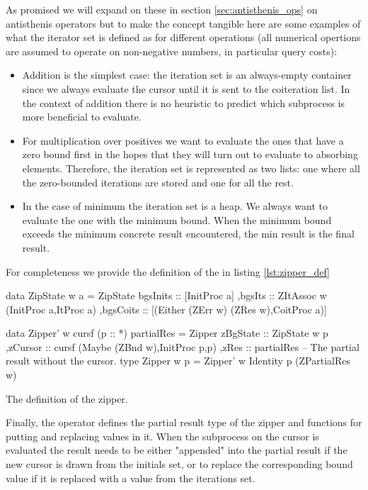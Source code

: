 As promised we will expand on these in section
\ref{sec:antisthenis_ops} on antisthenis operators but to make the
concept tangible here are some examples of what the iterator set is
defined as for different operations (all numerical opertions are
assumed to operate on non-negative numbers, in particular query
costs):

\begin{itemize}
\item Addition is the simplest case: the iteration set is an
  always-empty container since we always evaluate the cursor until it
  is sent to the coiteration list. In the context of addition there is
  no heuristic to predict which subprocess is more beneficial to
  evaluate.
\item For multiplication over positives we want to evaluate the ones
  that have a zero bound first in the hopes that they will turn out to
  evaluate to absorbing elements. Therefore, the iteration set is
  represented as two lists: one where all the zero-bounded iterations
  are stored and one for all the rest.
\item In the case of minimum the iteration set is a heap. We always
  want to evaluate the one with the minimum bound. When the minimum
  bound exceeds the minimum concrete result encountered, the min
  result is the final result.
\end{itemize}

For completeness we provide the definition of the  in
listing \ref{lst:zipper_def}

\begin{code}
\begin{haskellcode}
 data ZipState w a =
  ZipState
  { bgsInits :: [InitProc a]
   ,bgsIts :: ZItAssoc w (InitProc a,ItProc a)
   ,bgsCoits :: [(Either (ZErr w) (ZRes w),CoitProc a)]
  }

data Zipper' w cursf (p :: *) partialRes =
  Zipper
  { zBgState :: ZipState w p
   ,zCursor  :: cursf (Maybe (ZBnd w),InitProc p,p)
   ,zRes     :: partialRes -- The partial result without the cursor.
  }
type Zipper w p = Zipper' w Identity p (ZPartialRes w)
\end{haskellcode}
\label{lst:zipper_def}
\caption{The definition of the zipper.}
\end{code}

Finally, the operator defines the partial result type of the zipper
 and functions for putting and replacing values in
it. When the subprocess on the cursor is evaluated the result needs to
be either "appended" into the partial result if the new cursor is
drawn from the initials set, or to replace the corresponding bound
value if it is replaced with a value from the iterations set.

